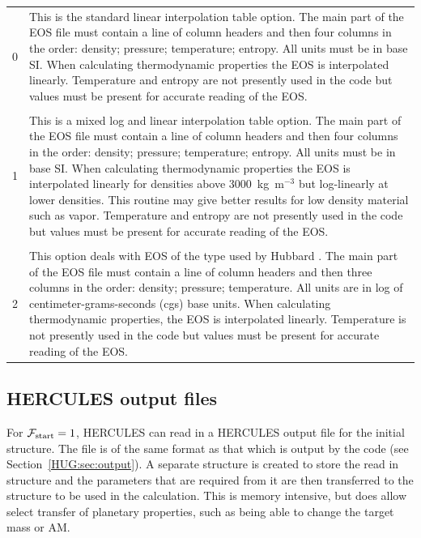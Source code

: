 \documentclass[11pt, oneside]{article}   	%
\begin{document}
\begin{longtable}{l p{12cm}}
0 & This is the standard linear interpolation table option. The main part of the EOS file must contain a line of column headers and then four columns in the order: density; pressure; temperature; entropy. All units must be in base SI. When calculating thermodynamic properties the EOS is interpolated linearly. Temperature and entropy are not presently used in the code but values must be present for accurate reading of the EOS. \\
\multicolumn{2}{l}{} \\
1 & This is a mixed log and linear interpolation table option. The main part of the EOS file must contain a line of column headers and then four columns in the order: density; pressure; temperature; entropy. All units must be in base SI. When calculating thermodynamic properties the EOS is interpolated linearly for densities above 3000~kg~m$^{-3}$ but log-linearly at lower densities. This routine may give better results for low density material such as vapor. Temperature and entropy are not presently used in the code but values must be present for accurate reading of the EOS. \\
\multicolumn{2}{l}{} \\
2 & This option deals with EOS of the type used by Hubbard \citep{Hubbard2013}. The main part of the EOS file must contain a line of column headers and then three columns in the order: density; pressure; temperature. All units are in log of centimeter-grams-seconds (cgs) base units. When calculating thermodynamic properties, the EOS is interpolated linearly. Temperature is not presently used in the code but values must be present for accurate reading of the EOS. 

\end{longtable}


\subsection{HERCULES output files}

For $\mathcal{F}_{\rm start}=1$, HERCULES can read in a HERCULES output file for the initial structure. 
The file is of the same format as that which is output by the code (see Section~\ref{HUG:sec:output}).
A separate structure is created to store the read in structure and the parameters that are required from it are then transferred to the structure to be used in the calculation.
This is memory intensive, but does allow select transfer of planetary properties, such as being able to change the target mass or AM. 
\end{document}
